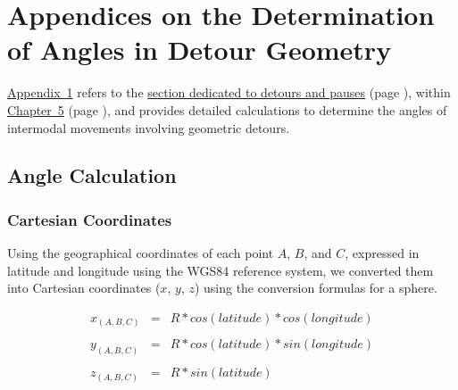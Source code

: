     \setcounter{section}{0}
\chapter{Appendices on the Determination of Angles in Detour Geometry}
    \label{annexes:calcul-detours}

\hyperref[annexes:calcul-detours]{Appendix~\ref{annexes:calcul-detours}} refers to the \hyperref[chap5:detours-pauses-optimisation]{section dedicated to detours and pauses} (page \pageref{chap5:detours-pauses-optimisation}), within \hyperref[chap5:titre]{Chapter~5} (page \pageref{chap5:titre}), and provides detailed calculations to determine the angles of intermodal movements involving geometric detours.%

    \setcounter{tocdepth}{2}
    \renewcommand{\localcontentsname}{Structure of Appendix~\ref{annexes:calcul-detours}}
\localtableofcontents

    \newpage
    \newpage
\section{Angle Calculation}
    \label{annexes:calcul-detours-angles}

\subsection{Cartesian Coordinates}
    \label{annexes:calcul-detours-angles-cartesien}

Using the geographical coordinates of each point \(A\), \(B\), and \(C\), expressed in latitude and longitude using the \acrshort{WGS84} reference system, we converted them into Cartesian coordinates (\(x\), \(y\), \(z\)) using the conversion formulas for a sphere.%

    \begin{equation*}
    \begin{array}{lclclclclcl}
    \displaystyle x_{(A, B, C)} &=& R* cos(latitude) * cos(longitude)\\\\
    \displaystyle y_{(A, B, C)} &=& R* cos(latitude) * sin(longitude)\\\\
    \displaystyle z_{(A, B, C)} &=& R* sin(latitude)\\\\
    \end{array}
    \end{equation*}

